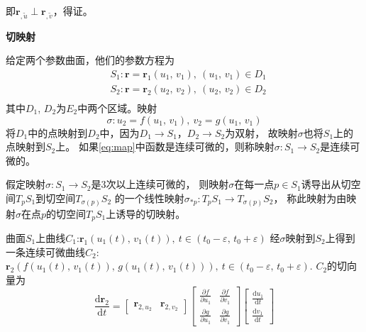 即$\mathbf{r}_{,\tilde{u}} \perp \mathbf{r}_{,\tilde{v}}$，得证。

\textbf{切映射}

给定两个参数曲面，他们的参数方程为
\begin{equation*}
    \begin{aligned}
        &S_{1}:\mathbf{r}=\mathbf{r}_{1}\left(u_{1},\,v_{1}\right),\ \left(u_{1},\,v_{1}\right)\in D_{1} \\
        &S_{2}:\mathbf{r}=\mathbf{r}_{2}\left(u_{2},\,v_{2}\right),\ \left(u_{2},\,v_{2}\right)\in D_{2} \\
    \end{aligned}
\end{equation*}
其中$D_{1}$, $D_{2}$为$E_{2}$中两个区域。映射
\begin{equation}\label{eq:map}
    \sigma:u_{2}=f\left(u_{1},\,v_{1}\right),\ v_{2}=g\left(u_{1},\,v_{1}\right)
\end{equation}
将$D_{1}$中的点映射到$D_{2}$中，因为$D_{1}\rightarrow S_{1}$，$D_{2}\rightarrow S_{2}$为双射，
故映射$\sigma$也将$S_{1}$上的点映射到$S_{2}$上。
如果\eqref{eq:map}中函数是连续可微的，则称映射$\sigma:S_{1}\rightarrow S_{2}$是连续可微的。

\begin{definition}
    假定映射$\sigma:S_{1}\rightarrow S_{2}$是3次以上连续可微的，
    则映射$\sigma$在每一点$p\in S_{1}$诱导出从切空间$T_{p}S_{1}$到切空间$T_{\sigma(p)}S_{2}$
    的一个线性映射$\sigma_{*p}:T_{p}S_{1}\rightarrow T_{\sigma(p)}S_{2}$，
    称此映射为由映射$\sigma$在点$p$的切空间$T_{p}S_{1}$上诱导的切映射。
\end{definition}

曲面$S_{1}$上曲线$C_{1}$:$\mathbf{r}_{1}\left(u_{1}(t),\,v_{1}(t)\right),\ t\in\left(t_{0}-\varepsilon,\,t_{0}+\varepsilon\right)$
经$\sigma$映射到$S_{2}$上得到一条连续可微曲线$C_{2}$:
$\mathbf{r}_{2}\left(f\left(u_{1}(t),\,v_{1}(t)\right),\,g\left(u_{1}(t),\,v_{1}(t)\right)\right),\ t\in\left(t_{0}-\varepsilon,\,t_{0}+\varepsilon\right)$.
$C_{2}$的切向量为
\begin{equation*}
    \frac{\mathrm{d}\mathbf{r}_{2}}{\mathrm{d}t}=\left[\begin{array}{cc}
        \mathbf{r}_{2,u_{2}} & \mathbf{r}_{2,v_{2}}
    \end{array}\right]\left[\begin{array}{cc}
        \frac{\partial f}{\partial u_{1}} & \frac{\partial f}{\partial v_{1}} \\
        \frac{\partial g}{\partial u_{1}} & \frac{\partial g}{\partial v_{1}}
    \end{array}\right]\left[\begin{array}{cc}
        \frac{\mathrm{d}u_{1}}{\mathrm{d}t} \\ \frac{\mathrm{d}v_{1}}{\mathrm{d}t}
    \end{array}\right]
\end{equation*}


